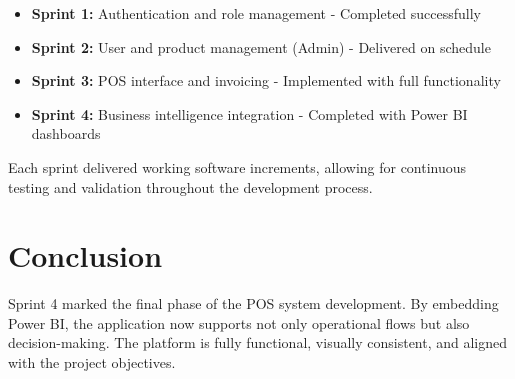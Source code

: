 \begin{itemize}
  \item \textbf{Sprint 1:} Authentication and role management - Completed successfully
  \item \textbf{Sprint 2:} User and product management (Admin) - Delivered on schedule
  \item \textbf{Sprint 3:} POS interface and invoicing - Implemented with full functionality
  \item \textbf{Sprint 4:} Business intelligence integration - Completed with Power BI dashboards
\end{itemize}

Each sprint delivered working software increments, allowing for continuous testing and validation throughout the development process.

\section{Conclusion}

Sprint 4 marked the final phase of the POS system development. By embedding Power BI, the application now supports not only operational flows but also decision-making. The platform is fully functional, visually consistent, and aligned with the project objectives.
